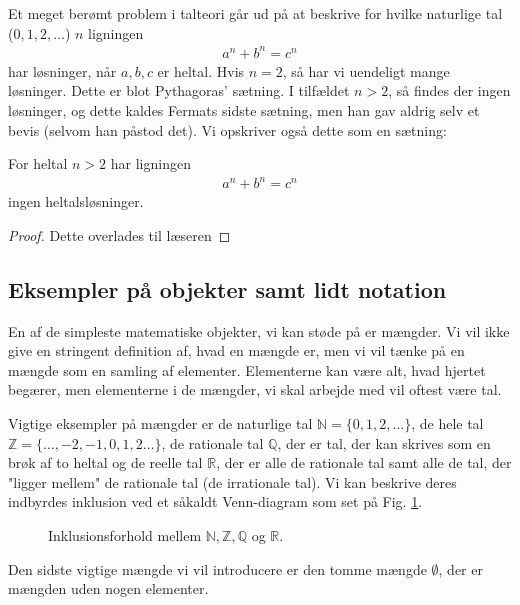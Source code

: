 \begin{exa}\label{exa:exa2}
Et meget berømt problem i talteori går ud på at beskrive for hvilke naturlige tal ($0,1,2,\hdots$) $n$ ligningen 
\begin{align*}
a^n+b^n=c^n
\end{align*}
har løsninger, når $a,b,c$ er heltal. Hvis $n=2$, så har vi uendeligt mange løsninger. Dette er blot Pythagoras' sætning. I tilfældet $n>2$, så findes der ingen løsninger, og dette kaldes Fermats sidste sætning, men han gav aldrig selv et bevis (selvom han påstod det). Vi opskriver også dette som en sætning:
\begin{setn}
For heltal $n>2$ har ligningen 
\begin{align*}
a^n+b^n = c^n 
\end{align*}
ingen heltalsløsninger.
\end{setn}
\begin{proof}
Dette overlades til læseren
\end{proof}
\end{exa}
\subsection*{Eksempler på objekter samt lidt notation}
En af de simpleste matematiske objekter, vi kan støde på er mængder. Vi vil ikke give en stringent definition af, hvad en mængde er, men vi vil tænke på en mængde som en samling af elementer. Elementerne kan være alt, hvad hjertet begærer, men elementerne i de mængder, vi skal arbejde med vil oftest være tal. 
\begin{exa}
Vigtige eksempler på mængder er de naturlige tal $\mathbb{N} = \{0,1,2,\hdots\}$, de hele tal $\mathbb{Z} = \{\hdots,-2,-1,0,1,2\hdots\}$, de rationale tal $\mathbb{Q}$, der er tal, der kan skrives som en brøk af to heltal og de reelle tal $\mathbb{R}$, der er alle de rationale tal samt alle de tal, der "ligger mellem" de rationale tal (de irrationale tal). Vi kan beskrive deres indbyrdes inklusion ved et såkaldt Venn-diagram som set på Fig. \ref{fig:venn}.
\begin{figure}[H]
\centering
{}
\caption{Inklusionsforhold mellem $\mathbb{N},\mathbb{Z},\mathbb{Q}$ og $\mathbb{R}$.}
\label{fig:venn}
\end{figure}
\end{exa}
Den sidste vigtige mængde vi vil introducere er den tomme mængde $\emptyset$, der er mængden uden nogen elementer.



